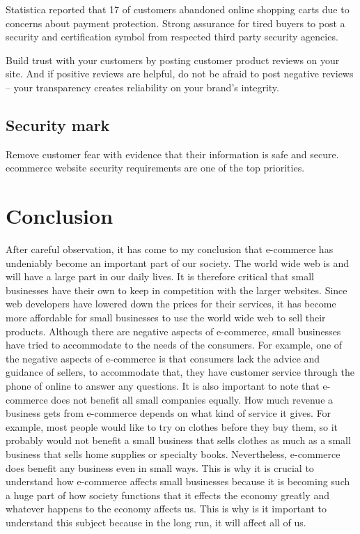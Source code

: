 \documentclass{article}
\begin{document}
Statistica reported that 17 of customers abandoned online shopping carts due to concerns about payment protection. Strong assurance for tired buyers to post a security and certification symbol from respected third party security agencies.
 
Build trust with your customers by posting customer product reviews on your site. And if positive reviews are helpful, do not be afraid to post negative reviews – your transparency creates reliability on your brand’s integrity.
\subsection{Security mark}
Remove customer fear with evidence that their information is safe and secure. ecommerce website security requirements are one of the top priorities.

\vspace{5\baselineskip}

\section{Conclusion}
After careful observation, it has come to my conclusion that e-commerce has undeniably become an important part of our society. The world wide web is and will have a large part in our daily lives. It is therefore critical that small businesses have their own to keep in competition with the larger websites. Since web developers have lowered down the prices for their services, it has become more affordable for small businesses to use the world wide web to sell their products. Although there are negative aspects of e-commerce, small businesses have tried to accommodate to the needs of the consumers. For example, one of the negative aspects of e-commerce is that consumers lack the advice and guidance of sellers, to accommodate that, they have customer service through the phone of online to answer any questions. It is also important to note that e-commerce does not benefit all small companies equally. How much revenue a business gets from e-commerce depends on what kind of service it gives. For example, most people would like to try on clothes before they buy them, so it probably would not benefit a small business that sells clothes as much as a small business that sells home supplies or specialty books. Nevertheless, e-commerce does benefit any business even in small ways. This is why it is crucial to understand how e-commerce affects small businesses because it is becoming such a huge part of how society functions that it effects the economy greatly and whatever happens to the economy affects us. This is why is it important to understand this subject because in the long run, it will affect all of us.



 
\end{document}
